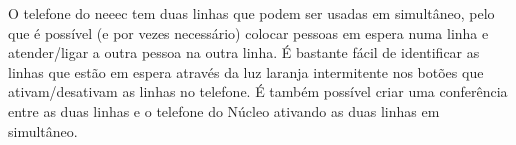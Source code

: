 O telefone do \acrshort{neeec} tem duas linhas que podem ser usadas em simultâneo, pelo que é possível (e por vezes necessário) colocar pessoas em espera numa linha e atender/ligar a outra pessoa na outra linha. É bastante fácil de identificar as linhas que estão em espera através da luz laranja intermitente nos botões que ativam/desativam as linhas no telefone. É também possível criar uma conferência entre as duas linhas e o telefone do Núcleo ativando as duas linhas em simultâneo.